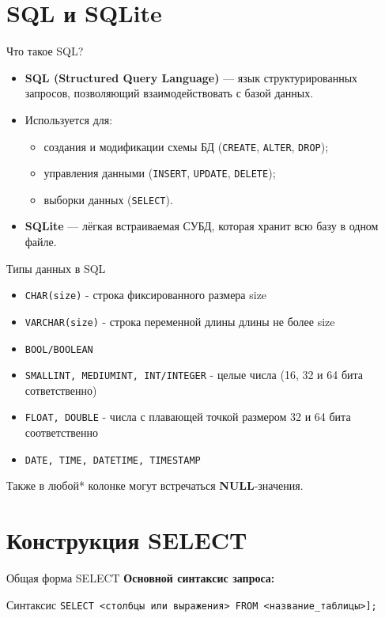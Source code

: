 \documentclass{beamer}
\begin{document}
\section{SQL и SQLite}
\begin{frame}{Что такое SQL?}
	\begin{itemize}
		\item \textbf{SQL (Structured Query Language)} --- язык структурированных запросов,
		      позволяющий взаимодействовать с базой данных.
		\item Используется для:
		      \begin{itemize}
			      \item создания и модификации схемы БД (\texttt{CREATE}, \texttt{ALTER}, \texttt{DROP});
			      \item управления данными (\texttt{INSERT}, \texttt{UPDATE}, \texttt{DELETE});
			      \item выборки данных (\texttt{SELECT}).
		      \end{itemize}
		\item \textbf{SQLite} --- лёгкая встраиваемая СУБД, которая хранит всю базу в одном файле.
	\end{itemize}
\end{frame}

\begin{frame}[fragile]{Типы данных в SQL}
	\begin{itemize}
		\item \texttt{CHAR(size)} - строка фиксированного размера size
		\item \texttt{VARCHAR(size)} - строка переменной длины длины не более size
		\item \texttt{BOOL/BOOLEAN}
		\item \texttt{SMALLINT, MEDIUMINT, INT/INTEGER} - целые числа (16, 32 и 64 бита сответственно)
		\item \texttt{FLOAT, DOUBLE} - числа с плавающей точкой размером 32 и 64 бита соответственно
		\item \texttt{DATE, TIME, DATETIME, TIMESTAMP}
	\end{itemize}
	Также в любой* колонке могут встречаться \textbf{NULL}-значения.
\end{frame}

\section{Конструкция SELECT}
\begin{frame}{Общая форма SELECT}
	\textbf{Основной синтаксис запроса:}
	\begin{block}{Синтаксис}
		\texttt{SELECT <столбцы или выражения>\newline
			FROM <название\_таблицы>\newline
			[ORDER BY <столбцы> [ASC|DESC]];}
	\end{block}
\end{frame}
\end{document}
